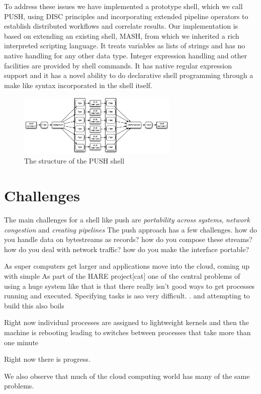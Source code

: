 \documentclass{sig-alt-release2}
\begin{document}
To address these issues we have implemented a prototype shell, which
we call PUSH, using DISC principles and incorporating extended
pipeline operators to establish distributed workflows and correlate
results.  Our implementation is based on extending an existing
shell, MASH\cite{}, from which we inherited a rich interpreted scripting
language.  It treats variables as lists of strings and has no native
handling for any other data type.  Integer expression handling and
other facilities are provided by shell commands.  It has native
regular expression support and it has a novel ability to do declarative
shell programming through a make like syntax incorporated in the
shell itself.

\begin{figure}[htp]
\centering
\includegraphics[width=3in]{pipestruct.eps}
\caption{The structure of the PUSH shell}
\label{fig:pipestruct} 
\end{figure}


\section{Challenges}
The main challenges for a shell like push are \emph{portability
across systems}, \emph{network congestion} and \emph{creating
pipelines} The push approach has a few challenges. how do you handle
data on bytestreams as records? how do you compose these streams?
how do you deal with network traffic? how do you make the interface
portable?


As super computers get larger and applications move into the cloud,
coming up with simple As part of the HARE project[cat] one of the
central problems of using a huge system like that is that there
really isn't good ways to get processes running and executed.
Specifying tasks is aso very difficult. . and attempting to build
this also boils

Right now individual processes are assigned to lightweight kernels
and then the machine is rebooting leading to switches between
processes that take more than one minute \cite{colorad}

Right now there is progress.

We also observe that much of the cloud computing world has many of
the same problems.
\end{document}
